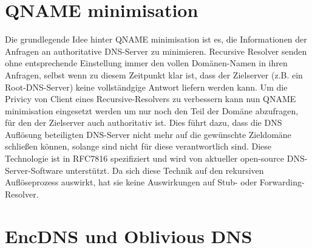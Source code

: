 \section{QNAME minimisation}

Die grundlegende Idee hinter QNAME minimisation ist es, die Informationen der Anfragen an authoritative DNS-Server zu minimieren. Recursive Resolver senden ohne entsprechende Einstellung immer den vollen Domänen-Namen in ihren Anfragen, selbst wenn zu diesem Zeitpunkt klar ist, dass der Zielserver (z.B. ein Root-DNS-Server) keine vollständgige Antwort liefern werden kann. Um die Privicy von Client eines Recursive-Resolvers zu verbessern kann nun QNAME minimisation eingesetzt werden um nur noch den Teil der Domäne abzufragen, für den der Zielserver auch authoritativ ist. Dies führt dazu, dass die DNS Auflösung beteiligten DNS-Server nicht mehr auf die gewünschte Zieldomäne schließen können, solange sind nicht für diese verantwortlich sind. Diese Technologie ist in RFC7816 spezifiziert und wird von aktueller open-source DNS-Server-Software unterstützt. Da sich diese Technik auf den rekursiven Auflöseprozess auswirkt, hat sie keine Auswirkungen auf Stub- oder Forwarding-Resolver.

\section{EncDNS und Oblivious DNS}

